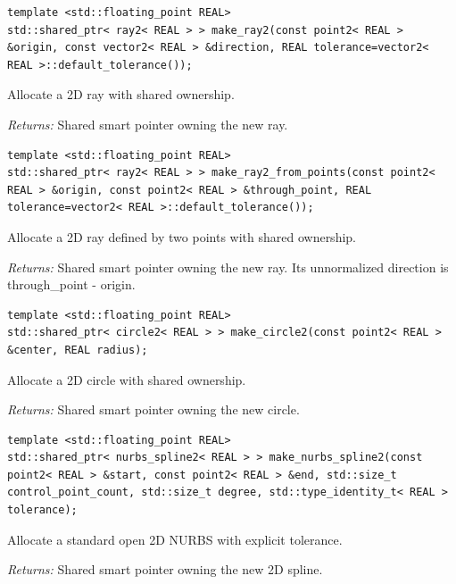 \par\noindent\begin{minipage}{\linewidth}
\begin{lstlisting}[style=apireference]
template <std::floating_point REAL>
std::shared_ptr< ray2< REAL > > make_ray2(const point2< REAL > &origin, const vector2< REAL > &direction, REAL tolerance=vector2< REAL >::default_tolerance());
\end{lstlisting}
{\footnotesize Allocate a 2D ray with shared ownership.\par}
{\footnotesize\textit{Returns:} Shared smart pointer owning the new ray.\par}
\end{minipage}\par\vspace{1pt}
\par\noindent\begin{minipage}{\linewidth}
\begin{lstlisting}[style=apireference]
template <std::floating_point REAL>
std::shared_ptr< ray2< REAL > > make_ray2_from_points(const point2< REAL > &origin, const point2< REAL > &through_point, REAL tolerance=vector2< REAL >::default_tolerance());
\end{lstlisting}
{\footnotesize Allocate a 2D ray defined by two points with shared ownership.\par}
{\footnotesize\textit{Returns:} Shared smart pointer owning the new ray. Its unnormalized direction is through\_point - origin.\par}
\end{minipage}\par\vspace{1pt}
\par\noindent\begin{minipage}{\linewidth}
\begin{lstlisting}[style=apireference]
template <std::floating_point REAL>
std::shared_ptr< circle2< REAL > > make_circle2(const point2< REAL > &center, REAL radius);
\end{lstlisting}
{\footnotesize Allocate a 2D circle with shared ownership.\par}
{\footnotesize\textit{Returns:} Shared smart pointer owning the new circle.\par}
\end{minipage}\par\vspace{1pt}
\par\noindent\begin{minipage}{\linewidth}
\begin{lstlisting}[style=apireference]
template <std::floating_point REAL>
std::shared_ptr< nurbs_spline2< REAL > > make_nurbs_spline2(const point2< REAL > &start, const point2< REAL > &end, std::size_t control_point_count, std::size_t degree, std::type_identity_t< REAL > tolerance);
\end{lstlisting}
{\footnotesize Allocate a standard open 2D NURBS with explicit tolerance.\par}
{\footnotesize\textit{Returns:} Shared smart pointer owning the new 2D spline.\par}
\end{minipage}\par\vspace{1pt}
